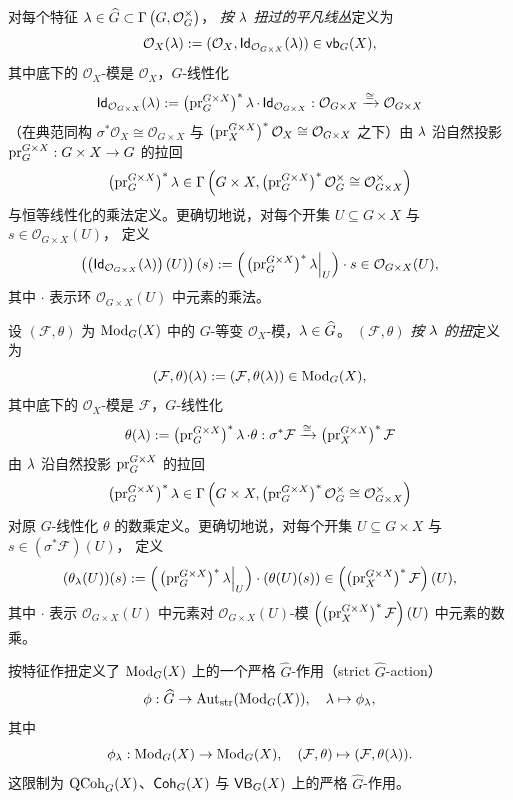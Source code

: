 \begin{defn}[按特征作扭]
对每个特征
$\operatorname{\lambda} \in \widehat{G}\subset\Gamma\left(G, \mathcal{O}_G^\times\right)$，
\emph{按 $\operatorname{\lambda}$ 扭过的平凡线丛}定义为
$$
\mathcal{O}_X(\operatorname{\lambda})
:=
(\mathcal{O}_X, \operatorname{\mathsf{Id}}_{\mathcal{O}_{G\times X}}(\operatorname{\lambda}))
\in \operatorname{\mathsf{vb}}_G(X),
$$
其中底下的 $\mathcal{O}_X$-模是 $\mathcal{O}_X$，$G$-线性化
$$
\operatorname{\mathsf{Id}}_{\mathcal{O}_{G\times X}}(\operatorname{\lambda})
:=
\left(\operatorname{\operatorname{pr}}_G^{G \times X}\right)^* \operatorname{\lambda} \cdot \operatorname{\mathsf{Id}}_{\mathcal{O}_{G\times X}}
:
\mathcal{O}_{G\times X}
\xrightarrow{\cong}
\mathcal{O}_{G\times X}
$$
（在典范同构
$
\sigma^* \mathcal{O}_X
\cong
\mathcal{O}_{G\times X}
$
与
$
\left(\operatorname{\operatorname{pr}}_X^{G \times X}\right)^* \mathcal{O}_X
\cong
\mathcal{O}_{G\times X}
$
之下）由 $\operatorname{\lambda}$ 沿自然投影
$\operatorname{\operatorname{pr}}_G^{G\times X}:G\times X\rightarrow G$ 的拉回
$$
\left(\operatorname{\operatorname{pr}}_G^{G \times X}\right)^* \operatorname{\lambda}
\in
\Gamma\left(G \times X, \left(\operatorname{\operatorname{pr}}_G^{G\times X}\right)^*\mathcal{O}_G^\times \cong \mathcal{O}_{G \times X}^\times\right)
$$
与恒等线性化的乘法定义。更确切地说，对每个开集
$U\subseteq G\times X$
与
$s\in\mathcal{O}_{G\times X}(U)$，
定义
$$
\left(\left(\operatorname{\mathsf{Id}}_{\mathcal{O}_{G\times X}}(\operatorname{\lambda})\right)(U)\right)(s)
:=
\left(\left.\left(\operatorname{\operatorname{pr}}_G^{G \times X}\right)^* \operatorname{\lambda}\right|_U\right)
\cdot
s
\in
\mathcal{O}_{G\times X}(U),
$$
其中 $\cdot$ 表示环
$\mathcal{O}_{G\times X}(U)$ 中元素的乘法。

设 $(\mathcal{F}, \theta)$ 为 $\operatorname{\mathrm{Mod}}_G(X)$ 中的 $G$-等变 $\mathcal{O}_X$-模，$\operatorname{\lambda} \in \widehat{G}$。
$(\mathcal{F},\theta)$ \emph{按 $\operatorname{\lambda}$ 的扭}定义为
$$
(\mathcal{F},\theta)(\operatorname{\lambda})
:=
(\mathcal{F}, \theta(\operatorname{\lambda}))
\in \operatorname{\mathrm{Mod}}_G(X),
$$
其中底下的 $\mathcal{O}_X$-模是 $\mathcal{F}$，$G$-线性化
$$
\theta(\operatorname{\lambda})
:=
\left(\operatorname{\operatorname{pr}}_G^{G \times X}\right)^* \operatorname{\lambda} \cdot \theta
:
\sigma^* \mathcal{F}
\xrightarrow{\cong}
\left(\operatorname{\operatorname{pr}}_X^{G \times X}\right)^* \mathcal{F}
$$
由 $\operatorname{\lambda}$ 沿自然投影 $\operatorname{\operatorname{pr}}_G^{G\times X}$ 的拉回
$$
\left(\operatorname{\operatorname{pr}}_G^{G \times X}\right)^* \operatorname{\lambda}
\in
\Gamma\left(G \times X, \left(\operatorname{\operatorname{pr}}_G^{G\times X}\right)^*\mathcal{O}_G^\times \cong \mathcal{O}_{G \times X}^\times\right)
$$
对原 $G$-线性化 $\theta$ 的数乘定义。更确切地说，对每个开集
$U\subseteq G\times X$
与
$s\in(\sigma^*\mathcal{F})(U)$，
定义
$$
(\theta_{\operatorname{\lambda}}(U))(s)
:=
\left(\left.\left(\operatorname{\operatorname{pr}}_G^{G \times X}\right)^* \operatorname{\lambda}\right|_U\right)
\cdot
(\theta(U)(s))
\in
\left(\left(\operatorname{\operatorname{pr}}_X^{G \times X}\right)^*\mathcal{F}\right)(U),
$$
其中 $\cdot$ 表示 $\mathcal{O}_{G\times X}(U)$ 中元素对 $\mathcal{O}_{G\times X}(U)$-模
$\left(\left(\operatorname{\operatorname{pr}}_X^{G \times X}\right)^*\mathcal{F}\right)(U)$ 中元素的数乘。

按特征作扭定义了 $\operatorname{\mathrm{Mod}}_G(X)$ 上的一个严格 $\widehat{G}$-作用（strict $\widehat{G}$-action）
$$
\phi:\widehat{G}\rightarrow\operatorname{Aut}_{\operatorname{\operatorname{str}}}(\operatorname{\mathrm{Mod}}_G(X)),
\quad
\operatorname{\lambda}\mapsto \phi_{\operatorname{\lambda}},
$$
其中
$$
\phi_{\operatorname{\lambda}}:\operatorname{\mathrm{Mod}}_G(X)\rightarrow\operatorname{\mathrm{Mod}}_G(X),
\quad
(\mathcal{F},\theta)
\mapsto
(\mathcal{F},\theta(\operatorname{\lambda})).
$$
这限制为 $\operatorname{\mathrm{QCoh}}_G(X)$、$\operatorname{\mathsf{Coh}}_G(X)$ 与 $\operatorname{\mathsf{VB}}_G(X)$ 上的严格 $\widehat{G}$-作用。
\end{defn}

